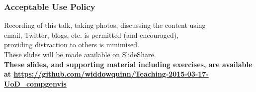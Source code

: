 
%
\begin{frame}
  \frametitle{Acceptable Use Policy}
  Recording of this talk, taking photos, discussing the content using \\
  email, Twitter, blogs, etc. is permitted (and encouraged), \\
  providing distraction to others is minimised. \\[0.5cm]
  These slides will be made available on SlideShare. \\[0.5cm]
  \textbf{These slides, and supporting material including exercises, are available at \href{https://github.com/widdowquinn/Teaching-2015-03-17-UoD_compgenvis}{https://github.com/widdowquinn/Teaching-2015-03-17-UoD\_compgenvis}}
\end{frame}